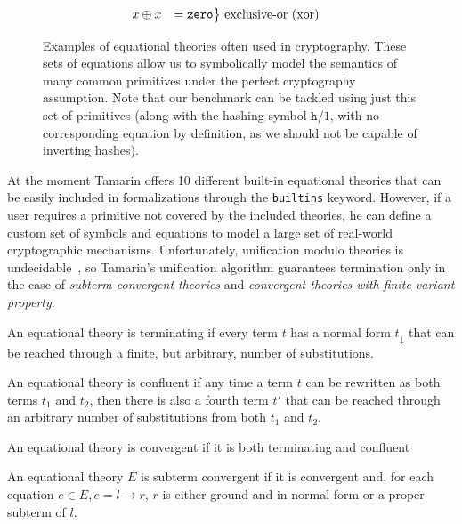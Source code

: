 \begin{figure}
\begin{align*}
\begin{rcases}
            x \oplus x &= \texttt{zero}
        \end{rcases} \ &\text{exclusive-or (xor)}\\
    \end{align*}
    \caption{Examples of equational theories often used in cryptography. These sets of equations allow us to symbolically model the semantics of many common primitives under the perfect cryptography assumption. Note that our benchmark can be tackled using just this set of primitives (along with the hashing symbol $\texttt{h}/1$, with no corresponding equation by definition, as we should not be capable of inverting hashes).}
    \label{fig:equationscrypto}
\end{figure}

At the moment Tamarin offers 10 different built-in equational theories that can be easily included in formalizations through the \texttt{builtins} keyword. However, if a user requires a primitive not covered by the included theories, he can define a custom set of symbols and equations to model a large set of real-world cryptographic mechanisms. Unfortunately, unification modulo theories is undecidable~\cite{unificationUndecidability}, so Tamarin's unification algorithm guarantees termination only in the case of \textit{subterm-convergent theories} and \textit{convergent theories with finite variant property}.

\begin{definition}
    An equational theory is terminating if every term $t$ has a normal form $t_\downarrow$ that can be reached through a finite, but arbitrary, number of substitutions.
\end{definition}

\begin{definition}
    An equational theory is confluent if any time a term $t$ can be rewritten as both terms $t_1$ and $t_2$, then there is also a fourth term $t'$ that can be reached through an arbitrary number of substitutions from both $t_1$ and $t_2$.
\end{definition}

\begin{definition}
    An equational theory is convergent if it is both terminating and confluent
\end{definition}

\begin{definition}
    An equational theory $E$ is subterm convergent if it is convergent and, for each equation $e \in E, e = l \rightarrow r$, $r$ is either ground and in normal form or a proper subterm of $l$.
\end{definition}

